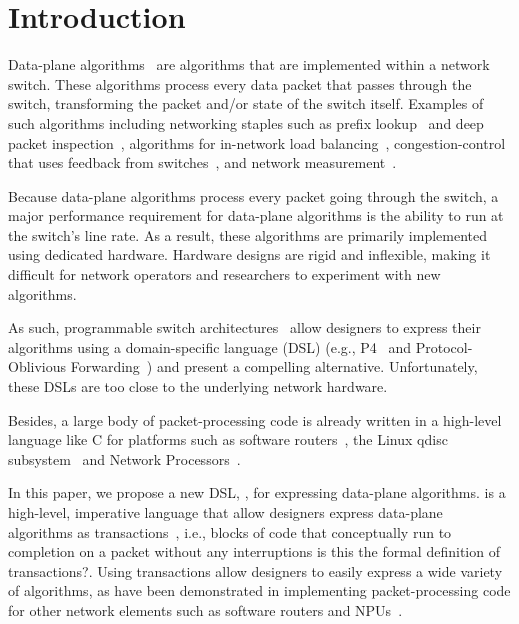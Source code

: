 \section{Introduction}
\label{s:intro}

Data-plane algorithms~\cite{cestan} are algorithms that are implemented within
a network switch. These algorithms process every data packet that passes
through the switch, transforming the packet and/or state of the switch itself.
Examples of such algorithms including networking staples such as prefix
lookup~\cite{lookup} and deep packet inspection~\cite{ids}, algorithms for
in-network load balancing~\cite{conga, ecmp}, congestion-control that uses
feedback from switches~\cite{xcp, rcp, pdq, dctcp}, and network
measurement~\cite{minsketch, heavy_hitters}.

Because data-plane algorithms process every packet going through the switch, a
major performance requirement for data-plane algorithms is the ability to run
at the switch's line rate. As a result, these algorithms are primarily implemented
using dedicated hardware. Hardware designs are rigid and inflexible, making it difficult
for network operators and researchers to experiment with new algorithms.

As such, programmable switch architectures~\cite{flexpipe, xpliant, rmt} allow
designers to express their algorithms using a domain-specific language (DSL)
(e.g., P4~\cite{p4} and Protocol-Oblivious Forwarding~\cite{pof}) and present
a compelling alternative.  Unfortunately, these DSLs are too close to the
underlying network hardware.


Besides, a large body of packet-processing code is already written in a
high-level language like C for platforms such as software routers~\cite{click},
the Linux qdisc subsystem~\cite{qdisc} and Network Processors~\cite{npu}.

In this paper, we propose a new DSL, \pktlanguage, for expressing 
data-plane algorithms. \pktlanguage
is a high-level, imperative language that allow 
designers express data-plane algorithms as transactions~\cite{transactions}, 
i.e., blocks of code that conceptually run to completion on a packet without any
interruptions \ac{is this the formal definition of transactions?}. Using 
transactions allow designers to easily express a wide variety of algorithms,
as have been demonstrated in implementing packet-processing code for 
other network elements such as software routers and NPUs~\cite{click, intel, qdisc}.

